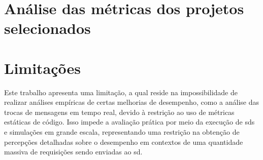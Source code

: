 \section{Análise das métricas dos projetos selecionados}

\section{Limitações}
\label{sec:limitacoes}

Este trabalho apresenta uma limitação, a qual reside na impossibilidade de realizar análises empíricas de certas melhorias de desempenho, como a análise das trocas de mensagens em tempo real, devido à restrição ao uso de métricas estáticas de código. Isso impede a avaliação prática por meio da execução de \gls{sds} e simulações em grande escala, representando uma restrição na obtenção de percepções detalhadas sobre o desempenho em contextos de uma quantidade massiva de requisições sendo enviadas ao \gls{sd}.